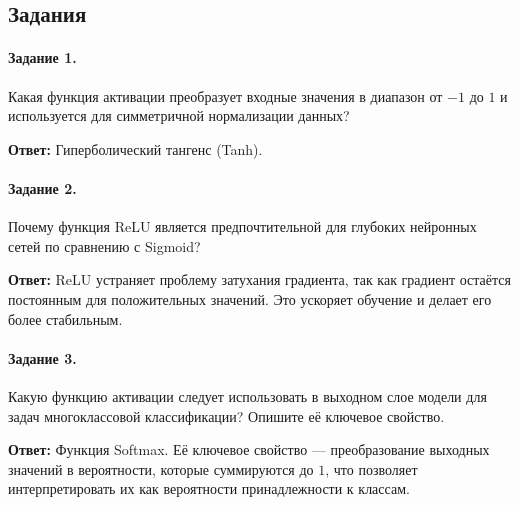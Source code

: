 \documentclass[a4paper,12pt]{article}
\begin{document}
\subsection*{Задания}

\paragraph{Задание 1.} Какая функция активации преобразует входные значения в диапазон от $-1$ до $1$ и используется для симметричной нормализации данных?

\textbf{Ответ:} Гиперболический тангенс (Tanh).

\paragraph{Задание 2.} Почему функция ReLU является предпочтительной для глубоких нейронных сетей по сравнению с Sigmoid?

\textbf{Ответ:} ReLU устраняет проблему затухания градиента, так как градиент остаётся постоянным для положительных значений. Это ускоряет обучение и делает его более стабильным.

\paragraph{Задание 3.} Какую функцию активации следует использовать в выходном слое модели для задач многоклассовой классификации? Опишите её ключевое свойство.

\textbf{Ответ:} Функция Softmax. Её ключевое свойство — преобразование выходных значений в вероятности, которые суммируются до $1$, что позволяет интерпретировать их как вероятности принадлежности к классам.
\end{document}
